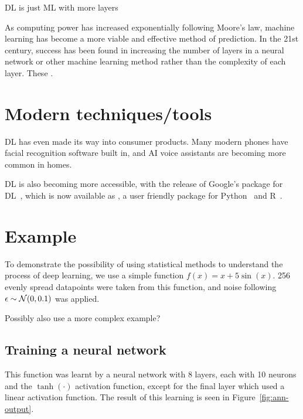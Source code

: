 \begin{todo}
	DL is just ML with more layers 
\end{todo}

As computing power has increased exponentially following Moore's law, machine learning has become a more viable and effective method of prediction.
In the 21st century, success has been found in increasing the number of layers in a neural network or other machine learning method rather than the complexity of each layer.
These  .

\section{Modern techniques/tools}

\ac{DL} has even made its way into consumer products.
Many modern phones have facial recognition software built in, and \ac{AI} voice assistants are becoming more common in homes.

\ac{DL} is also becoming more accessible, with the release of Google's  package for \ac{DL}~\autocite{abadi2016}, which is now available as , a user friendly package for Python~\autocite{chollet2015} and R~\autocite{allaire2018}.

\section{Example}

To demonstrate the possibility of using statistical methods to understand the process of deep learning, we use a simple function \(f(x) = x + 5 \sin(x)\).
256 evenly spread datapoints were taken from this function, and noise following \(\epsilon \sim \mathcal{N}(0, 0.1)\) was applied.

\begin{todo}
Possibly also use a more complex example?
\end{todo}

\subsection{Training a neural network}

This function was learnt by a neural network with 8 layers, each with 10 neurons and the \(\tanh(\cdot)\) activation function, except for the final layer which used a linear activation function.
The result of this learning is seen in Figure~\ref{fig:ann-output}.

